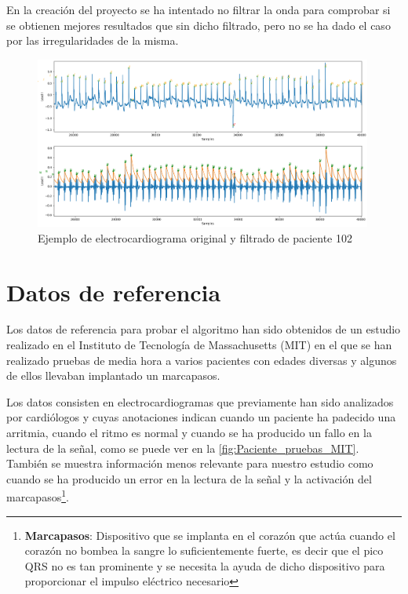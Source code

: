 En la creación del proyecto se ha intentado no filtrar la onda para comprobar si se obtienen mejores resultados que sin dicho filtrado, pero no se ha dado el caso por las irregularidades de la misma.

\begin{figure}[h!]
	\centering
	\includegraphics[width=0.99\textwidth]{./Images/img_introduccion/102filtrado_y_sin_filtrar.png}
	\caption{Ejemplo de electrocardiograma original y filtrado de paciente 102}
	\label{fig:102filtradoysinfiltrar}
\end{figure}

\section{Datos de referencia}
Los datos de referencia para probar el algoritmo han sido obtenidos de un estudio realizado en el Instituto de Tecnología de Massachusetts (MIT) \cite{MIT} en el que se han realizado pruebas de media hora a varios pacientes con edades diversas y algunos de ellos llevaban implantado un marcapasos.

Los datos consisten en electrocardiogramas que previamente han sido analizados por cardiólogos y cuyas anotaciones indican cuando un paciente ha padecido una arritmia, cuando el ritmo es normal y cuando se ha producido un fallo en la lectura de la señal, como se puede ver en la \cref{fig:Paciente_pruebas_MIT}. También se muestra información menos relevante para nuestro 
estudio como cuando se ha producido un error en la lectura de la señal y la activación del marcapasos\footnote{\textbf{Marcapasos}: Dispositivo que se implanta en el corazón que actúa cuando el corazón no bombea la sangre lo suficientemente fuerte, es decir que el pico QRS no es tan prominente
y se necesita la ayuda de dicho dispositivo para proporcionar el impulso eléctrico necesario}.

